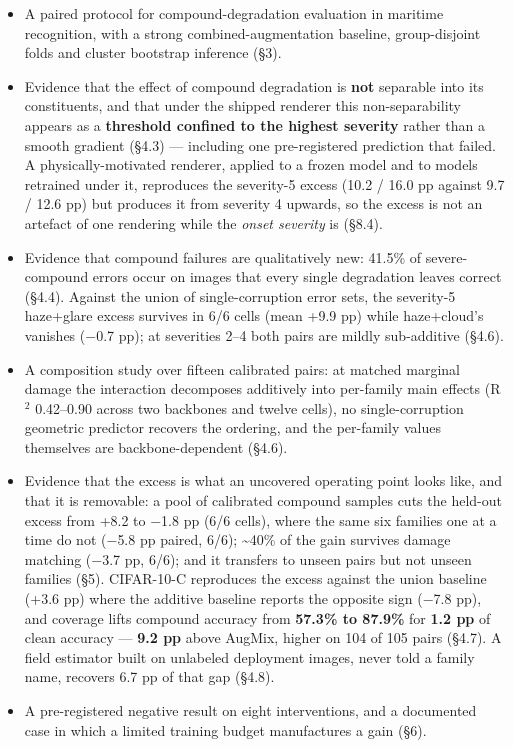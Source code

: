 \begin{itemize}
\item A paired protocol for compound-degradation evaluation in maritime recognition, with a strong combined-augmentation baseline, group-disjoint folds and cluster bootstrap inference (§3).
\item Evidence that the effect of compound degradation is \textbf{not} separable into its constituents, and that under the shipped renderer this non-separability appears as a \textbf{threshold confined to the highest severity} rather than a smooth gradient (§4.3) --- including one pre-registered prediction that failed. A physically-motivated renderer, applied to a frozen model and to models retrained under it, reproduces the severity-5 excess (10.2 / 16.0 pp against 9.7 / 12.6 pp) but produces it from severity 4 upwards, so the excess is not an artefact of one rendering while the \emph{onset severity} is (§8.4).
\item Evidence that compound failures are qualitatively new: 41.5\% of severe-compound errors occur on images that every single degradation leaves correct (§4.4). Against the union of single-corruption error sets, the severity-5 haze+glare excess survives in 6/6 cells (mean +9.9 pp) while haze+cloud's vanishes ($-$0.7 pp); at severities 2--4 both pairs are mildly sub-additive (§4.6).
\item A composition study over fifteen calibrated pairs: at matched marginal damage the interaction decomposes additively into per-family main effects (R$^2$ 0.42--0.90 across two backbones and twelve cells), no single-corruption geometric predictor recovers the ordering, and the per-family values themselves are backbone-dependent (§4.6).
\item Evidence that the excess is what an uncovered operating point looks like, and that it is removable: a pool of calibrated compound samples cuts the held-out excess from +8.2 to $-$1.8 pp (6/6 cells), where the same six families one at a time do not ($-$5.8 pp paired, 6/6); \textasciitilde{}40\% of the gain survives damage matching ($-$3.7 pp, 6/6); and it transfers to unseen pairs but not unseen families (§5). CIFAR-10-C reproduces the excess against the union baseline (+3.6 pp) where the additive baseline reports the opposite sign ($-$7.8 pp), and coverage lifts compound accuracy from \textbf{57.3\% to 87.9\%} for \textbf{1.2 pp} of clean accuracy --- \textbf{9.2 pp} above AugMix, higher on 104 of 105 pairs (§4.7). A field estimator built on unlabeled deployment images, never told a family name, recovers 6.7 pp of that gap (§4.8).
\item A pre-registered negative result on eight interventions, and a documented case in which a limited training budget manufactures a gain (§6).
\end{itemize}
